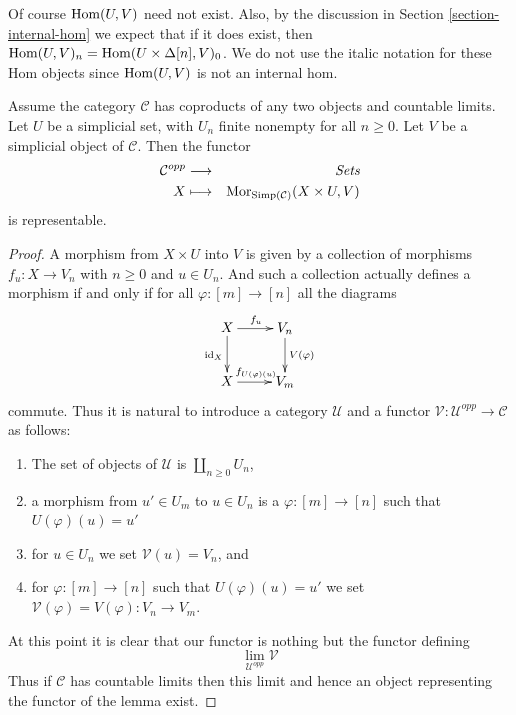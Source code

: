 \noindent
Of course $\mathop{\mathrm{Hom}}\nolimits(U, V)$ need not exist.
Also, by the discussion in Section \ref{section-internal-hom}
we expect that if it does exist, then
$\mathop{\mathrm{Hom}}\nolimits(U, V)_n = \mathop{\mathrm{Hom}}\nolimits(U \times \Delta[n], V)_0$.
We do not use the italic notation for these Hom objects
since $\mathop{\mathrm{Hom}}\nolimits(U, V)$ is not an internal hom.

\begin{lemma}
\label{lemma-exists-hom-0-from-simplicial-set}
Assume the category $\mathcal{C}$
has coproducts of any two objects and countable
limits. Let $U$ be a simplicial set, with $U_n$ finite nonempty
for all $n \geq 0$.
Let $V$ be a simplicial object of $\mathcal{C}$.
Then the functor
\begin{eqnarray*}
\mathcal{C}^{opp} & \longrightarrow & \textit{Sets} \\
X
& \longmapsto &
\mathop{\mathrm{Mor}}\nolimits_{\text{Simp}(\mathcal{C})}(X \times U, V)
\end{eqnarray*}
is representable.
\end{lemma}

\begin{proof}
A morphism from $X \times U$ into $V$ is given by a collection
of morphisms $f_u : X \to V_n$ with $n \geq 0$ and $u \in U_n$.
And such a collection actually defines a morphism if and only
if for all $\varphi : [m] \to [n]$ all the diagrams
$$
\xymatrix{
X \ar[r]^{f_u} \ar[d]_{\text{id}_X} & V_n \ar[d]^{V(\varphi)} \\
X \ar[r]^{f_{U(\varphi)(u)}} & V_m
}
$$
commute. Thus it is natural to introduce a category
$\mathcal{U}$ and a functor
$\mathcal{V} : \mathcal{U}^{opp} \to \mathcal{C}$
as follows:
\begin{enumerate}
\item The set of objects of $\mathcal{U}$ is
$\coprod_{n \geq 0} U_n$,
\item a morphism from $u' \in U_m$ to $u \in U_n$
is a $\varphi : [m] \to [n]$ such that $U(\varphi)(u) = u'$
\item for $u \in U_n$ we set $\mathcal{V}(u) = V_n$, and
\item for $\varphi : [m] \to [n]$ such that $U(\varphi)(u) = u'$
we set $\mathcal{V}(\varphi) = V(\varphi) : V_n \to V_m$.
\end{enumerate}
At this point it is clear that our functor is nothing but the
functor defining
$$
\lim_{\mathcal{U}^{opp}} \mathcal{V}
$$
Thus if $\mathcal{C}$ has countable limits then this limit
and hence an object representing the functor of the lemma
exist.
\end{proof}

